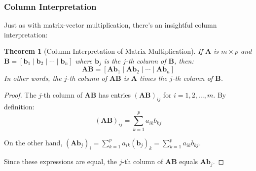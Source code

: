 \documentclass[12pt]{article}
\numberwithin{equation}{section}
\newcommand{\vect}[1]{\boldsymbol{#1}}   %
\newcommand{\mat}[1]{\mathbf{#1}}        %
\theoremstyle{plain}
\newtheorem{theorem}{Theorem}[section]
\theoremstyle{definition}
\theoremstyle{remark}
\begin{document}
\subsubsection{Column Interpretation}

Just as with matrix-vector multiplication, there's an insightful column interpretation:

\begin{theorem}[Column Interpretation of Matrix Multiplication]
If $\mat{A}$ is $m \times p$ and $\mat{B} = [\vect{b}_1 \mid \vect{b}_2 \mid \cdots \mid \vect{b}_n]$ where $\vect{b}_j$ is the $j$-th column of $\mat{B}$, then:
$$\mat{A}\mat{B} = [\mat{A}\vect{b}_1 \mid \mat{A}\vect{b}_2 \mid \cdots \mid \mat{A}\vect{b}_n]$$
In other words, the $j$-th column of $\mat{A}\mat{B}$ is $\mat{A}$ times the $j$-th column of $\mat{B}$.
\end{theorem}

\begin{proof}
The $j$-th column of $\mat{A}\mat{B}$ has entries $(\mat{A}\mat{B})_{ij}$ for $i = 1, 2, \ldots, m$. By definition:
$$(\mat{A}\mat{B})_{ij} = \sum_{k=1}^p a_{ik}b_{kj}$$

On the other hand, $(\mat{A}\vect{b}_j)_i = \sum_{k=1}^p a_{ik}(\vect{b}_j)_k = \sum_{k=1}^p a_{ik}b_{kj}$.

Since these expressions are equal, the $j$-th column of $\mat{A}\mat{B}$ equals $\mat{A}\vect{b}_j$.
\end{proof}
\end{document}
